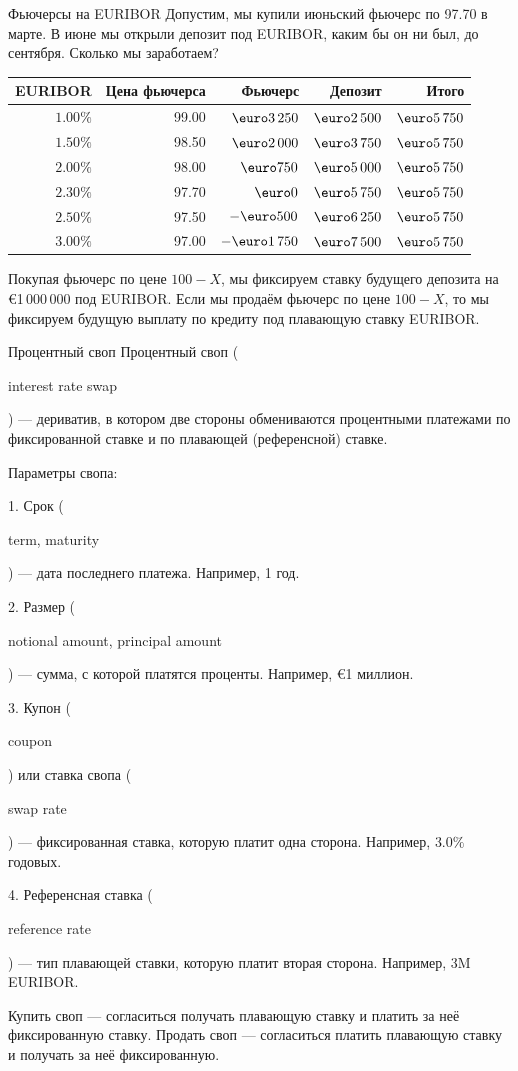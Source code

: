 \documentclass{beamer}
\renewcommand{\EUR}[1]{\textup{\euro}#1}
\newcommand{\en}[1]{\begin{otherlanguage}{english}#1\end{otherlanguage}}
\begin{document}
\begin{frame}{Фьючерсы на EURIBOR}
\justify
Допустим, мы купили июньский фьючерс по 97.70 в марте. В июне мы открыли депозит под
EURIBOR, каким бы он ни был, до сентября. Сколько мы заработаем?

\justify
\centering
\begin{tabular}{r|r|r|r|r}
EURIBOR   & Цена фьючерса & Фьючерс         & Депозит & Итого \\ \hline
$1.00\%$ & 99.00        & $\EUR{3\,250}$ & $\EUR{2\,500}$  & $\EUR{5\,750}$ \\
$1.50\%$ & 98.50        & $\EUR{2\,000}$ & $\EUR{3\,750}$  & $\EUR{5\,750}$ \\
$2.00\%$ & 98.00        & $\EUR{750}$    & $\EUR{5\,000}$  & $\EUR{5\,750}$ \\
$2.30\%$ & 97.70        & $\EUR{0}$       & $\EUR{5\,750}$  & $\EUR{5\,750}$ \\
$2.50\%$ & 97.50        & $-\EUR{500}$    & $\EUR{6\,250}$ & $\EUR{5\,750}$ \\
$3.00\%$ & 97.00        & $-\EUR{1\,750}$ & $\EUR{7\,500}$ & $\EUR{5\,750}$
\end{tabular}

\justify
Покупая фьючерс по цене $100-X$, мы фиксируем ставку будущего депозита на \EUR{1\,000\,000} под EURIBOR. Если мы продаём фьючерс по цене $100-X$, то мы фиксируем будущую выплату по кредиту под плавающую ставку EURIBOR.
\end{frame}



\begin{frame}{Процентный своп}
\justify
\alert{Процентный своп} (\en{interest rate swap}) --- дериватив, в котором две стороны 
обмениваются процентными платежами по фиксированной ставке и по плавающей (референсной) 
ставке. 

\justify
Параметры свопа:

1. Срок (\en{term, maturity}) --- дата последнего платежа. Например, 1 год.

2. Размер (\en{notional amount, principal amount}) --- сумма, с которой платятся проценты. Например, \EUR{1} миллион.

3. Купон (\en{coupon}) или ставка свопа (\en{swap rate}) --- фиксированная ставка, которую платит одна сторона. Например, $3.0\%$ годовых.

4. Референсная ставка (\en{reference rate}) --- тип плавающей ставки, которую платит вторая сторона. Например, 3M EURIBOR.

\justify
Купить своп --- согласиться получать плавающую ставку и платить за неё фиксированную ставку. Продать своп --- согласиться платить плавающую ставку и получать за неё фиксированную.
\end{frame}
\end{document}
